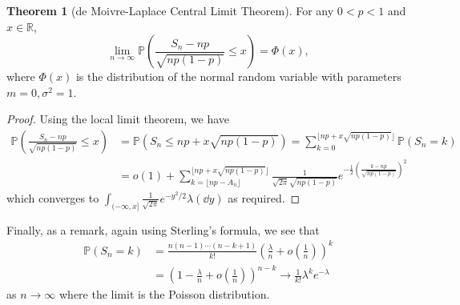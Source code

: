 \documentclass[]{article}
\theoremstyle{definition}
\newtheorem{theorem}{Theorem}
\theoremstyle{definition}
\begin{document}
\begin{theorem}[de Moivre-Laplace Central Limit Theorem]
  For any \(0 < p < 1\) and \(x \in \mathbb{R}\), 
  \[\lim_{n \to \infty} \mathbb{P}\left(\frac{S_n - np}{\sqrt{np(1 - p)}} \le x\right) = \Phi(x),\]
  where \(\Phi(x)\) is the distribution of the normal random variable with parameters 
  \(m = 0, \sigma^2 = 1\).
\end{theorem}
\begin{proof}
  Using the local limit theorem, we have
  \[\begin{split}
    \mathbb{P}\left(\frac{S_n - np}{\sqrt{np(1 - p)}} \le x\right) & = 
    \mathbb{P}(S_n \le np + x\sqrt{np(1 - p)})
     = \sum_{k = 0}^{\lfloor np + x\sqrt{np(1 - p)}\rfloor} \mathbb{P}(S_n = k)\\
      & = o(1) + \sum_{k = \lfloor np - A_n \rfloor}^{\lfloor np + x\sqrt{np(1 - p)}\rfloor}
      \frac{1}{\sqrt{2\pi}\sqrt{np(1 - p)}}e^{-\frac{1}{2}\left(\frac{k - np}{\sqrt{np(1 - p)}}\right)^2}
  \end{split}\]
  which converges to \(\int_{(-\infty, x]} \frac{1}{\sqrt{2\pi}} e^{-y^2 / 2} \lambda(\dd y)\) as 
  required.
\end{proof}

Finally, as a remark, again using Sterling's formula, we see that 
\[\begin{split}
  \mathbb{P}(S_n = k) & = \frac{n(n - 1) \cdots (n - k + 1)}{k!}\left(\frac{\lambda}{n} + o\left(\frac{1}{n}\right)\right)^k\\
  & = \left(1 - \frac{\lambda}{n} + o\left(\frac{1}{n}\right)\right)^{n - k} \to \frac{1}{k!} \lambda^ke^{-\lambda}
\end{split}\]
as \(n \to \infty\) where the limit is the Poisson distribution. 
\end{document}
